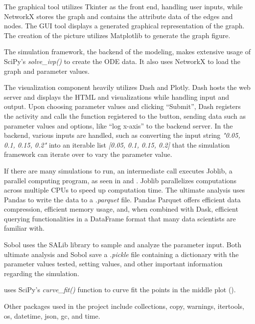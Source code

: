 The graphical tool utilizes Tkinter as the front end, handling user inputs, while NetworkX \cite{hagbergExploringNetworkStructure2008} stores the graph and contains the attribute data of the edges and nodes. 
The GUI tool displays a generated graphical representation of the graph. 
The creation of the picture utilizes Matplotlib \cite{Matplotlib} to generate the graph figure. 

The simulation framework, the backend of the modeling, makes extensive usage of SciPy's \textit{solve\_ivp()} to create the ODE data. 
It also uses NetworkX to load the graph and parameter values. 

The visualization component heavily utilizes Dash and Plotly. 
Dash hosts the web server and displays the HTML and visualizations while handling input and output. 
Upon choosing parameter values and clicking “Submit”, Dash registers the activity and calls the function registered to the button, sending data such as parameter values and options, like “log x-axis” to the backend server. 
In the backend, various inputs are handled, such as converting the input string \textit{"0.05, 0.1, 0.15, 0.2"} into an iterable list \textit{[0.05, 0.1, 0.15, 0.2]} that the simulation framework can iterate over to vary the parameter value. 

If there are many simulations to run, an intermediate call executes Joblib, a parallel computing program, as seen in  and . 
Joblib parallelizes computations across multiple CPUs to speed up computation time. 
The ultimate analysis uses Pandas to write the data to a \textit{.parquet} file. 
Pandas Parquet offers efficient data compression, efficient memory usage, and, when combined with Dask, efficient querying functionalities in a DataFrame format that many data scientists are familiar with. 

Sobol uses the SALib library to sample and analyze the parameter input. 
Both ultimate analysis and Sobol save a \textit{.pickle} file containing a dictionary with the parameter values tested, setting values, and other important information regarding the simulation. 

 uses SciPy's \textit{curve\_fit()} function to curve fit the points in the middle plot (). 

Other packages used in the project include collections, copy, warnings, itertools, os, datetime, json, gc, and time. 